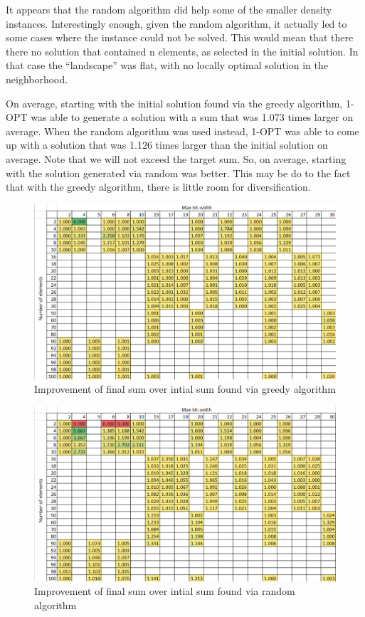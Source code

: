 \documentclass{report}
\begin{document}
It appears that the random algorithm did help some of the smaller density instances. Interestingly enough, given
the random algorithm, it actually led to some cases where the instance could not be solved. This would mean
that there there no solution that contained n elements, as selected in the initial solution. In that case the ``landscape''
was flat, with no locally optimal solution in the neighborhood.

On average, starting with the initial solution found via the greedy algorithm, 1-OPT was able to generate a solution
with a sum that was 1.073 times larger on average. When the random algorithm was used instead, 1-OPT was able to come up
with a solution that was 1.126 times larger than the initial solution on average. Note that we will not exceed the target sum.
So, on average, starting with the solution generated via random
was better. This may be do to the fact that with the greedy algorithm, there is little room for diversification.

\begin{figure}[h]
  \centering
  \includegraphics[width=12cm]{p5_greedy_final_over_initial.png}
  \caption{Improvement of final sum over intial sum found via greedy algorithm}
  \label{fig:greedy_final_initial_compare}
\end{figure}

\begin{figure}[h]
  \centering
  \includegraphics[width=12cm]{p5_random_final_over_initial.png}
  \caption{Improvement of final sum over intial sum found via random algorithm}
  \label{fig:random_final_initial_compare}
\end{figure}
\end{document}
